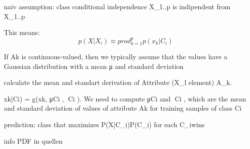 naiv assumption: class conditional independence
X_1..p is indipendent from X_1..p

This means:
\begin{equation} \label{eq:4}
p(X|X_i) \approx prod_{k=1}^{p}p(x_k|C_i)
\end{equation}

If Ak is continuous-valued, then we typically assume that
the values have a Gaussian distribution with a mean μ and
standard deviation

calculate the mean and standart derivation of Attribute (X_l element) A_k.

xk|Ci) = g(xk, μCi , Ci ).
We need to compute μCi and Ci , which are the mean and
standard deviation of values of attribute Ak for training
samples of class Ci

prediction:
class that maximizes P(X|C_i)P(C_i) for each C_iwins


info PDF in quellen
